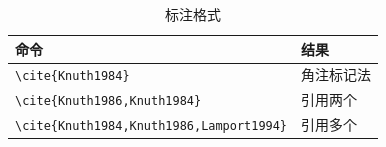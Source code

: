 \begin{table}
    \centering
    \caption{标注格式}
    \label{tab-ref}
    \begin{tabular}{ll}
        \toprule
        命令                                            & 结果                                         \\
        \midrule
        \verb|\cite{Knuth1984}|                       & 角注标记法\cite{Knuth1984}                      \\
        \verb|\cite{Knuth1986,Knuth1984}|             & 引用两个\cite{Knuth1986,Knuth1984}             \\
        \verb|\cite{Knuth1984,Knuth1986,Lamport1994}| & 引用多个\cite{Knuth1984,Knuth1986,Lamport1994} \\
        \bottomrule
    \end{tabular}
\end{table}

